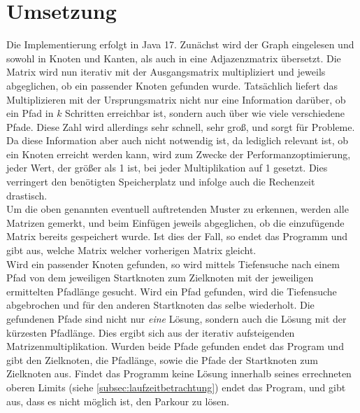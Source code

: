 \section{Umsetzung}\label{sec:umsetzung}
Die Implementierung erfolgt in Java 17.
Zunächst wird der Graph eingelesen und sowohl in Knoten und Kanten, als auch in eine Adjazenzmatrix übersetzt.
Die Matrix wird nun iterativ mit der Ausgangsmatrix multipliziert und jeweils abgeglichen, ob ein passender Knoten gefunden wurde.
Tatsächlich liefert das Multiplizieren mit der Ursprungsmatrix nicht nur eine Information darüber, ob ein Pfad
in $k$ Schritten erreichbar ist, sondern auch über wie viele verschiedene Pfade.
Diese Zahl wird allerdings sehr schnell, sehr groß, und sorgt für Probleme.
Da diese Information aber auch nicht notwendig ist, da lediglich relevant ist, ob ein Knoten erreicht werden kann,
wird zum Zwecke der Performanzoptimierung,
jeder Wert, der größer als 1 ist, bei jeder Multiplikation auf 1 gesetzt.
Dies verringert den benötigten Speicherplatz und infolge auch die Rechenzeit drastisch. \\
Um die oben genannten eventuell auftretenden Muster zu erkennen, werden alle Matrizen gemerkt, und beim Einfügen
jeweils abgeglichen, ob die einzufügende Matrix bereits gespeichert wurde.
Ist dies der Fall, so endet das Programm und gibt aus, welche Matrix welcher vorherigen Matrix gleicht. \\
Wird ein passender Knoten gefunden, so wird mittels Tiefensuche nach einem Pfad von dem jeweiligen Startknoten zum Zielknoten mit
der jeweiligen ermittelten Pfadlänge gesucht.
Wird ein Pfad gefunden, wird die Tiefensuche abgebrochen und für den anderen Startknoten das selbe wiederholt.
Die gefundenen Pfade sind nicht nur \textit{eine} Lösung, sondern auch die Lösung mit der kürzesten Pfadlänge.
Dies ergibt sich aus der iterativ aufsteigenden Matrizenmultiplikation.
Wurden beide Pfade gefunden endet das Program und gibt den Zielknoten, die Pfadlänge, sowie die Pfade der Startknoten zum Zielknoten aus.
Findet das Programm keine Lösung innerhalb seines errechneten oberen Limits (siehe \autoref{subsec:laufzeitbetrachtung}) endet das Program, und gibt aus,
dass es nicht möglich ist, den Parkour zu lösen.


